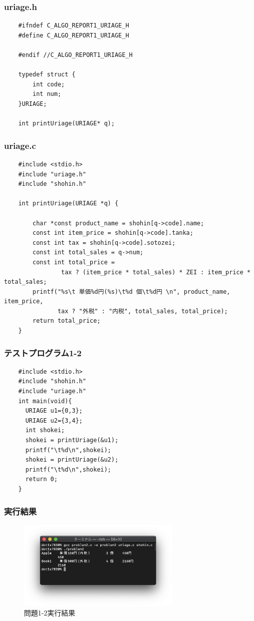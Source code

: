 \documentclass[10pt]{article}
\begin{document}
\subsubsection{uriage.h}
    \begin{lstlisting}
    #ifndef C_ALGO_REPORT1_URIAGE_H
    #define C_ALGO_REPORT1_URIAGE_H
    
    #endif //C_ALGO_REPORT1_URIAGE_H
    
    typedef struct {
        int code;
        int num;
    }URIAGE;
    
    int printUriage(URIAGE* q);
    \end{lstlisting}
    \pagebreak
\subsubsection{uriage.c}
    \begin{lstlisting}
    #include <stdio.h>
    #include "uriage.h"
    #include "shohin.h"
    
    int printUriage(URIAGE *q) {
    
        char *const product_name = shohin[q->code].name;
        const int item_price = shohin[q->code].tanka;
        const int tax = shohin[q->code].sotozei;
        const int total_sales = q->num;
        const int total_price =
                tax ? (item_price * total_sales) * ZEI : item_price * total_sales;
        printf("%s\t 単価%d円(%s)\t%d 個\t%d円 \n", product_name, item_price,
               tax ? "外税" : "内税", total_sales, total_price);
        return total_price;
    }
    \end{lstlisting}
\subsubsection{テストプログラム1-2}
    \begin{lstlisting}
    #include <stdio.h>
    #include "shohin.h"
    #include "uriage.h"
    int main(void){
      URIAGE u1={0,3};
      URIAGE u2={3,4};
      int shokei;
      shokei = printUriage(&u1);
      printf("\t%d\n",shokei);
      shokei = printUriage(&u2);
      printf("\t%d\n",shokei);
      return 0;
    }
    \end{lstlisting}
    
\subsubsection{実行結果}
\begin{figure}[H]
	\centering
	\includegraphics[width=0.7\textwidth]{problem1-2.png}
	\caption{問題1-2実行結果}
\end{figure}
\end{document}
